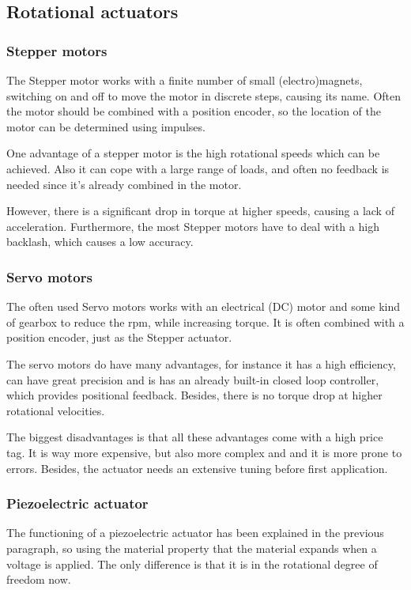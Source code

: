 \subsection{Rotational actuators}
\subsubsection*{Stepper motors}
The Stepper motor works with a finite number of small (electro)magnets, switching on and off to move the motor in discrete steps, causing its name. Often the motor should be combined with a position encoder, so the location of the motor can be determined using impulses. 

One advantage of a stepper motor is the high rotational speeds which can be achieved. Also it can cope with a large range of loads, and often no feedback is needed since it's already combined in the motor.

However, there is a significant drop in torque at higher speeds, causing a lack of acceleration. Furthermore, the most Stepper motors have to deal with a high backlash, which causes a low accuracy. 

\subsubsection*{Servo motors}
The often used Servo motors works with an electrical (DC) motor and some kind of gearbox to reduce the rpm, while increasing torque. It is often combined with a position encoder, just as the Stepper actuator. 

The servo motors do have many advantages, for instance it has a high efficiency, can have great precision and is has an already built-in closed loop controller, which provides positional feedback. Besides, there is no torque drop at higher rotational velocities.

The biggest disadvantages is that all these advantages come with a high price tag. It is way more expensive, but also more complex and and it is more prone to errors. Besides, the actuator needs an extensive tuning before first application.

\subsubsection*{Piezoelectric actuator}
The functioning of a piezoelectric actuator has been explained in the previous paragraph, so using the material property that the material expands when a voltage is applied. The only difference is that it is in the rotational degree of freedom now.


